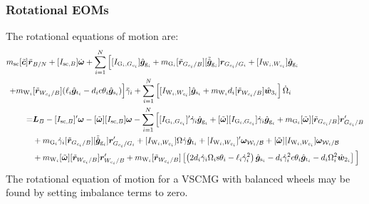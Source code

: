 \subsubsection{Rotational EOMs}

The rotational equations of motion are:
\begin{equation}
	\begin{split}
		m_{\text{\text{sc}}}[\tilde{\bm{c}}]\ddot{\bm r}&_{B/N} + [I_{\text{sc},B}]\dot{\bm\omega}
		+\sum\limits_{i=1}^{N} \Big[ [I_{\text{G}_i,G_{c_i}}]\hat{\bm{g}}_{\text{g}_i} + m_{\text{G}_i}[\tilde{\bm{r}}_{G_{c_i}/B}][\tilde{\hat{\bm g}}_{\text{g}_i}]\bm{r}_{G_{c_i}/G_i} + [I_{\text{W}_i,W_{c_i}}]\hat{\bm{g}}_{\text{g}_i} 
		\\
		+ m_{\text{W}_i}&[\tilde{\bm{r}}_{W_{c_i}/B}]( \ell_i\hat{\bm{g}}_{\text{t}_i} - d_ic\theta_i\hat{\bm{g}}_{\text{s}_i}) \Big] \ddot{\gamma}_i
		+\sum\limits_{i=1}^{N} \left[ [I_{\text{W}_i,W_{c_i}}]\hat{\bm{g}}_{\text{s}_i} + m_{\text{W}_i}d_i[\tilde{\bm{r}}_{W_{c_i}/B}]\hat{\bm w}_{3_i} \right] \dot{\Omega}_i
		\\
		=& \bm{L}_B - [I_{\text{sc},B}]'\bm{\omega} - [\tilde{\bm\omega}][I_{\text{sc},B}]\bm\omega
		-\sum\limits_{i=1}^{N} \Big[ 
		[I_{\text{G}_i,G_{c_i}}]'\dot{\gamma}_i\hat{\bm{g}}_{\text{g}_i} + [\tilde{\bm\omega}][I_{\text{G}_i,G_{c_i}}]\dot{\gamma}_i\hat{\bm{g}}_{\text{g}_i} + m_{\text{G}_i}[\tilde{\bm{\omega}}][\tilde{\bm{r}}_{G_{c_i}/B}]\bm{r}'_{G_{c_i}/B}
		\\&+ m_{\text{G}_i}\dot{\gamma}_i[\tilde{\bm{r}}_{G_{c_i}/B}][\tilde{\hat{\bm g}}_{\text{g}_i}]\bm{r}'_{G_{c_i}/G_i}
		+ [I_{\text{W}_i,W_{c_i}}]\Omega\dot{\gamma}\hat{\bm{g}}_{\text{t}_i} + [I_{\text{W}_i,W_{c_i}}]'\bm{\omega}_{\mathcal{W}_i/\cal B} + [\tilde{\bm{\omega}}][I_{\text{W}_i,W_{c_i}}]\bm{\omega}_{\mathcal{W}_i/\cal B} 
		\\
		&+ m_{\text{W}_i}[\tilde{\bm{\omega}}][\tilde{\bm{r}}_{W_{c_i}/B}]\bm{r}'_{W_{c_i}/B} + m_{\text{W}_i}[\tilde{\bm{r}}_{W_{c_i}/B}]\left[\left(2d_i\dot{\gamma}_i\Omega_i\text{s}\theta_i - \ell_i\dot{\gamma}_i^2\right)\hat{\bm{g}}_{\text{s}_i} - d_i\dot{\gamma}_i^2c\theta_i\hat{\bm{g}}_{\text{t}_i} - d_i\Omega_i^2 \hat{\bm{w}}_{2_i} \right]
		\Big]
	\end{split}
\label{eq:rotation}
\end{equation}
The rotational equation of motion for a VSCMG with balanced wheels may be found by setting imbalance terms to zero.
